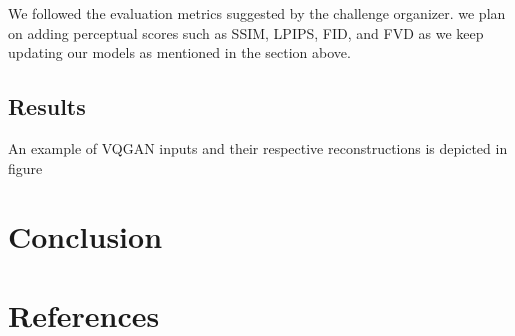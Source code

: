 \documentclass{article}
\begin{document}
We followed the evaluation metrics suggested by the challenge organizer. we plan on adding perceptual scores such as SSIM, LPIPS, FID, and FVD as we keep updating our models as mentioned in the section above. 


\subsection{Results}\label{Results}
An example of VQGAN inputs and their respective reconstructions is depicted in figure 



\section{Conclusion}


\newpage
\section{References}
{
\small
\printbibliography[title=Literature]
}

\end{document}
